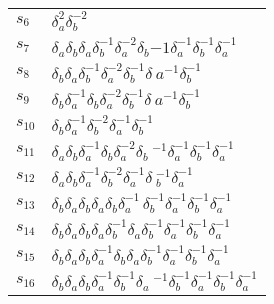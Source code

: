 \documentclass{article}
\begin{document}
\begin{center}
\begin{tabular}{ll}
$s_{6}$ & $\delta_a^{2}\delta_b^{-2}$ \\
$s_{7}$ & $\delta_a^{}\delta_b^{}\delta_a^{}\delta_b^{-1}\delta_a^{-2}\delta_b^\
{-1}\delta_a^{-1}\delta_b^{-1}\delta_a^{-1}$ \\
$s_{8}$ & $\delta_b^{}\delta_a^{}\delta_b^{-1}\delta_a^{-2}\delta_b^{-1}\delta_\
a^{-1}\delta_b^{-1}$ \\
$s_{9}$ & $\delta_b^{}\delta_a^{-1}\delta_b^{}\delta_a^{-2}\delta_b^{-1}\delta_\
a^{-1}\delta_b^{-1}$ \\
$s_{10}$ & $\delta_b^{}\delta_a^{-1}\delta_b^{-2}\delta_a^{-1}\delta_b^{-1}$ \\
$s_{11}$ & $\delta_a^{}\delta_b^{}\delta_a^{-1}\delta_b^{}\delta_a^{-2}\delta_b\
^{-1}\delta_a^{-1}\delta_b^{-1}\delta_a^{-1}$ \\
$s_{12}$ & $\delta_a^{}\delta_b^{}\delta_a^{-1}\delta_b^{-2}\delta_a^{-1}\delta\
_b^{-1}\delta_a^{-1}$ \\
$s_{13}$ & $\delta_b^{}\delta_a^{}\delta_b^{}\delta_a^{}\delta_b^{}\delta_a^{-1\
}\delta_b^{-1}\delta_a^{-1}\delta_b^{-1}\delta_a^{-1}$ \\
$s_{14}$ & $\delta_b^{}\delta_a^{}\delta_b^{}\delta_a^{}\delta_b^{-1}\delta_a^{\
}\delta_b^{-1}\delta_a^{-1}\delta_b^{-1}\delta_a^{-1}$ \\
$s_{15}$ & $\delta_b^{}\delta_a^{}\delta_b^{}\delta_a^{-1}\delta_b^{}\delta_a^{\
}\delta_b^{-1}\delta_a^{-1}\delta_b^{-1}\delta_a^{-1}$ \\
$s_{16}$ & $\delta_b^{}\delta_a^{}\delta_b^{}\delta_a^{-1}\delta_b^{-1}\delta_a\
^{-1}\delta_b^{-1}\delta_a^{-1}\delta_b^{-1}\delta_a^{-1}$ \\
\bottomrule
\end{tabular}
\end{center}

\thispagestyle{empty}
\end{document}
